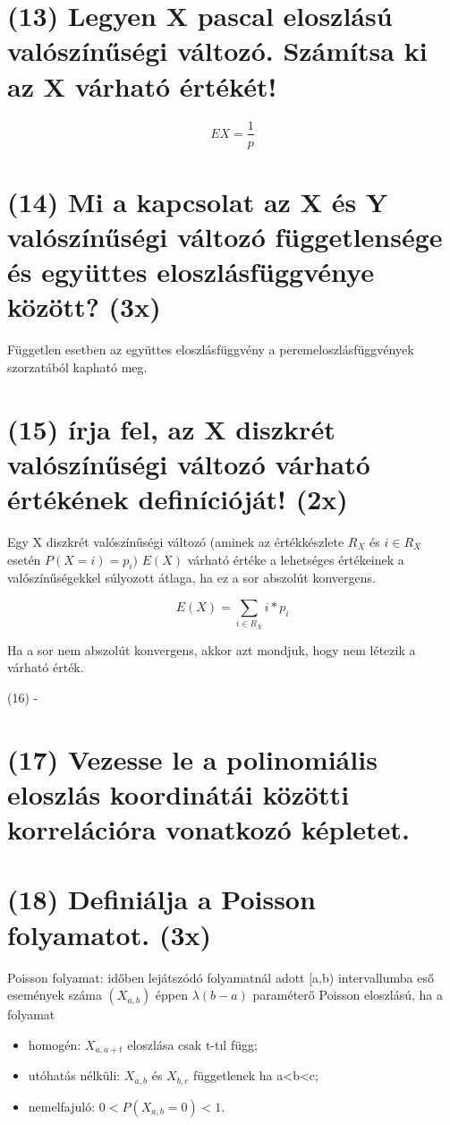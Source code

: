 \documentclass[12p]{article}
\begin{document}
\section{(13) Legyen X pascal eloszlású valószínűségi változó. Számítsa ki az X várható értékét!}

$$EX = \frac{1}{p}$$

\section{(14) Mi a kapcsolat az X és Y valószínűségi változó függetlensége és együttes eloszlásfüggvénye között? (3x)}

Független esetben az együttes eloszlásfüggvény a peremeloszlásfüggvények szorzatából kapható meg.

\section{(15) írja fel, az X diszkrét valószínűségi változó várható értékének definícióját! (2x)}

Egy X diszkrét valószínűségi változó (aminek az értékkészlete
$R_X$ és $i \in R_X$ esetén $P(X = i) = p_i)$ $E(X)$ várható értéke a lehetséges értékeinek a valószínűségekkel súlyozott átlaga, ha ez a sor abszolút konvergens.

$$E(X) = \sum_{i \in R_X} i * p_i$$

Ha a sor nem abszolút konvergens, akkor azt mondjuk, hogy nem létezik a várható érték.

(16) -

\section{(17) Vezesse le a polinomiális eloszlás koordinátái közötti korrelációra vonatkozó képletet.}

\section{(18) Definiálja a Poisson folyamatot. (3x)}

Poisson folyamat: időben lejátszódó folyamatnál adott [a,b) intervallumba eső események száma $(X_{a,b})$ éppen $\lambda(b-a)$ paraméterő Poisson eloszlású, ha a folyamat

\begin{itemize}
	\item homogén: $X_{a,a+t}$ eloszlása csak t-tıl függ;
	\item utóhatás nélküli: $X_{a,b}$ és $X_{b,c}$ függetlenek ha a<b<c;
	\item nemelfajuló: $0<P (X_{a,b}=0)<1$.

\end{itemize}
\end{document}
